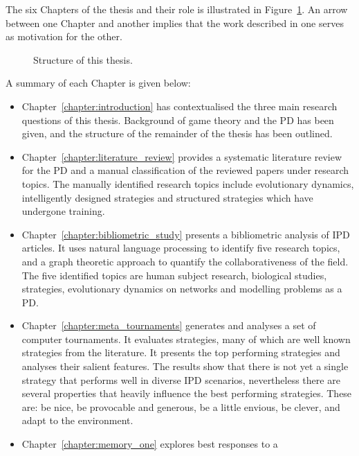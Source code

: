 The six Chapters of the thesis and their role is illustrated in
Figure~\ref{fig:structure_of_thesis}. An arrow between one Chapter and another
implies that the work described in one serves as motivation for the other.

\begin{figure}[!hbtp]
    \centering
    
    \caption{Structure of this thesis.}\label{fig:structure_of_thesis}
\end{figure}

A summary of each Chapter is given below:

\begin{itemize}
    \item Chapter~\ref{chapter:introduction} has contextualised the three main
    research questions of this thesis. Background of game theory and the
    PD has been given, and the structure
    of the remainder of the thesis has been outlined.
    \item Chapter~\ref{chapter:literature_review} provides a systematic
    literature review for the PD and a manual classification of
    the reviewed papers under research topics. The manually identified research
    topics include evolutionary dynamics, intelligently designed strategies
    and structured strategies which have undergone training.
    \item Chapter~\ref{chapter:bibliometric_study} presents a bibliometric
    analysis of \totalarticles IPD articles. It uses natural language processing to
    identify five research topics, and a graph theoretic approach to quantify the
    collaborativeness of the field. The five identified topics are human subject
    research, biological studies, strategies, evolutionary dynamics on networks
    and modelling problems as a PD.
    \item Chapter~\ref{chapter:meta_tournaments} generates and analyses a set of
    \numberofalltournaments computer tournaments. It evaluates
    \numberofstrategies strategies, many of which are well known strategies from
    the literature. It presents the top performing strategies and analyses their
    salient features. The results show that there is not yet a single strategy
    that performs well in diverse IPD scenarios,
    nevertheless there are several properties that heavily influence the best
    performing strategies. These are: be nice, be provocable and generous, be a
    little envious, be clever, and adapt to the environment.
    \item Chapter~\ref{chapter:memory_one} explores best responses to a

\end{itemize}
